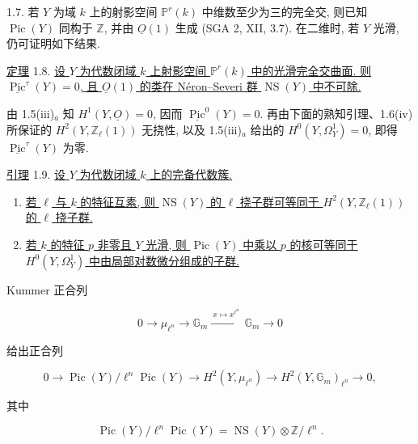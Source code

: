 1.7. 若 $Y$ 为域 $k$ 上的射影空间 $\mathbb P^r(k)$ 中维数至少为三的完全交, 则已知 $\operatorname{Pic}(Y)$ 同构于 $\mathbb Z$, 并由 $\underline O(1)$ 生成 (SGA 2, XII, 3.7). 在二维时, 若 $Y$ 光滑, 仍可证明如下结果.

\underline{定理} 1.8. \underline{设 $Y$ 为代数闭域 $k$ 上射影空间 $\mathbb P^r(k)$ 中的光滑完全交曲面. 则 $\underline{\operatorname{Pic}}^\tau(Y)=0$, 且 $\underline O(1)$ 的类在 Néron--Severi 群 $\operatorname{NS}(Y)$ 中不可除.}

由 1.5(iii)$_a$ 知 $H^1(Y,\underline O)=0$, 因而 $\underline{\operatorname{Pic}}^0(Y)=0$. 再由下面的熟知引理、1.6(iv) 所保证的 $H^2(Y,\mathbb Z_\ell(1))$ 无挠性, 以及 1.5(iii)$_a$ 给出的 $H^0(Y,\Omega_Y^1)=0$, 即得 $\underline{\operatorname{Pic}}^\tau(Y)$ 为零.

\underline{引理} 1.9. \underline{设 $Y$ 为代数闭域 $k$ 上的完备代数簇.}

\begin{enumerate}[label=(\roman*),leftmargin=2.6em]
\item \underline{若 $\ell$ 与 $k$ 的特征互素, 则 $\operatorname{NS}(Y)$ 的 $\ell$ 挠子群可等同于 $H^2(Y,\mathbb Z_\ell(1))$ 的 $\ell$ 挠子群.}


\item \underline{若 $k$ 的特征 $p$ 非零且 $Y$ 光滑, 则 $\operatorname{Pic}(Y)$ 中乘以 $p$ 的核可等同于 $H^0(Y,\Omega_Y^1)$ 中由局部对数微分组成的子群.}
\end{enumerate}

Kummer 正合列

\begin{equation*}
0\longrightarrow\mu_{\ell^n}\longrightarrow\mathbb G_m
\xrightarrow{\ x\mapsto x^{\ell^n}\ }\mathbb G_m\longrightarrow0
\end{equation*}

给出正合列

\begin{equation*}
0\longrightarrow
\operatorname{Pic}(Y)/\ell^n\operatorname{Pic}(Y)
\longrightarrow H^2(Y,\mu_{\ell^n})
\longrightarrow H^2(Y,\mathbb G_m)_{\ell^n}
\longrightarrow0,
\end{equation*}

其中

\begin{equation*}
\operatorname{Pic}(Y)/\ell^n\operatorname{Pic}(Y)
=\operatorname{NS}(Y)\otimes\mathbb Z/\ell^n.
\end{equation*}

